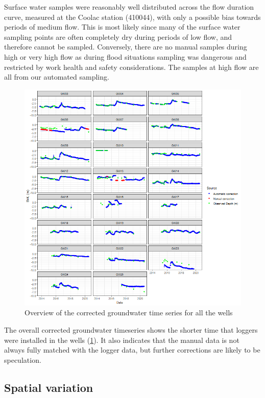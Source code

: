 \documentclass[, manuscript]{copernicus}
\begin{document}
Surface water samples were reasonably well distributed across the flow
duration curve, measured at the Coolac station (410044), with only a
possible bias towards periods of medium flow. This is most likely since
many of the surface water sampling points are often completely dry
during periods of low flow, and therefore cannot be sampled. Conversely,
there are no manual samples during high or very high flow as during
flood situations sampling was dangerous and restricted by work health
and safety considerations. The samples at high flow are all from our
automated sampling.

\clearpage

\begin{figure}
\includegraphics[width=1\linewidth]{Figures/Final_Corrected_piezodepths} \caption{Overview of the corrected groundwater time series for all the wells}\label{fig:gw-series}
\end{figure}

The overall corrected groundwater timeseries shows the shorter time that
loggers were installed in the wells (\ref{fig:gw-series}). It also
indicates that the manual data is not always fully matched with the
logger data, but further corrections are likely to be speculation.

\subsection{Spatial variation}
\end{document}
